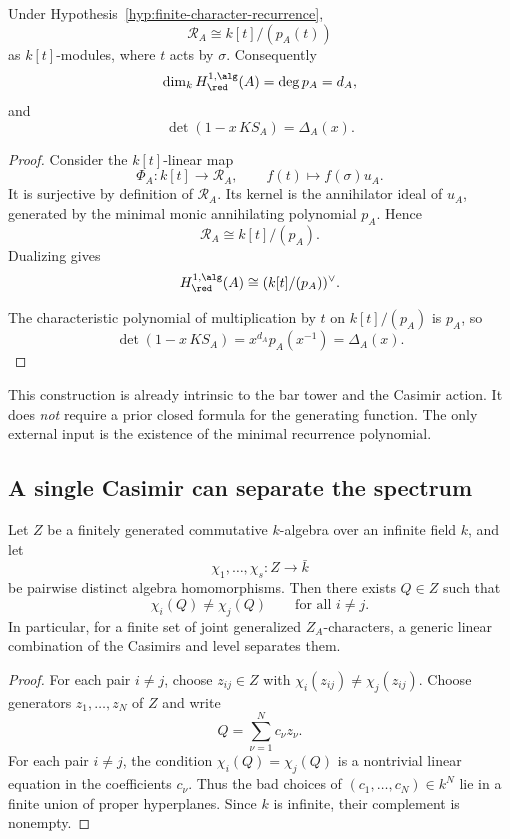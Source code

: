 \begin{theorem}
\label{thm:minimal-intrinsic-realization}
Under Hypothesis~\ref{hyp:finite-character-recurrence},
\[
\mathcal R_A\cong k[t]/(p_A(t))
\]
as \(k[t]\)-modules, where \(t\) acts by \(\sigma\).
Consequently
\[
\dim_k H^{1,\alg}_{\red}(A)=\deg p_A=d_A,
\]
and
\[
\det(1-x\,KS_A)=\Delta_A(x).
\]
\end{theorem}

\begin{proof}
Consider the \(k[t]\)-linear map
\[
\Phi_A\colon k[t]\to \mathcal R_A,\qquad f(t)\mapsto f(\sigma)u_A.
\]
It is surjective by definition of \(\mathcal R_A\).
Its kernel is the annihilator ideal of \(u_A\), generated by the minimal monic annihilating polynomial \(p_A\).
Hence
\[
\mathcal R_A\cong k[t]/(p_A).
\]
Dualizing gives
\[
H^{1,\alg}_{\red}(A)\cong (k[t]/(p_A))^\vee.
\]

The characteristic polynomial of multiplication by \(t\) on \(k[t]/(p_A)\) is \(p_A\), so
\[
\det(1-x\,KS_A)=x^{d_A}p_A(x^{-1})=\Delta_A(x).
\]
\end{proof}

\begin{remark}
This construction is already intrinsic to the bar tower and the Casimir action.
It does \emph{not} require a prior closed formula for the generating function.
The only external input is the existence of the minimal recurrence polynomial.
\end{remark}

\subsection{A single Casimir can separate the spectrum}

\begin{lemma}
\label{lem:generic-separator}
Let \(Z\) be a finitely generated commutative \(k\)-algebra over an infinite field \(k\), and let
\[
\chi_1,\dots,\chi_s\colon Z\to \bar{k}
\]
be pairwise distinct algebra homomorphisms.
Then there exists \(Q\in Z\) such that
\[
\chi_i(Q)\neq \chi_j(Q)\qquad\text{for all }i\neq j.
\]
In particular, for a finite set of joint generalized \(Z_A\)-characters, a generic linear combination of the Casimirs and level separates them.
\end{lemma}

\begin{proof}
For each pair \(i\neq j\), choose \(z_{ij}\in Z\) with \(\chi_i(z_{ij})\neq \chi_j(z_{ij})\).
Choose generators \(z_1,\dots,z_N\) of \(Z\) and write
\[
Q=\sum_{\nu=1}^N c_\nu z_\nu.
\]
For each pair \(i\neq j\), the condition \(\chi_i(Q)=\chi_j(Q)\) is a nontrivial linear equation in the coefficients \(c_\nu\).
Thus the bad choices of \((c_1,\dots,c_N)\in k^N\) lie in a finite union of proper hyperplanes.
Since \(k\) is infinite, their complement is nonempty.
\end{proof}

